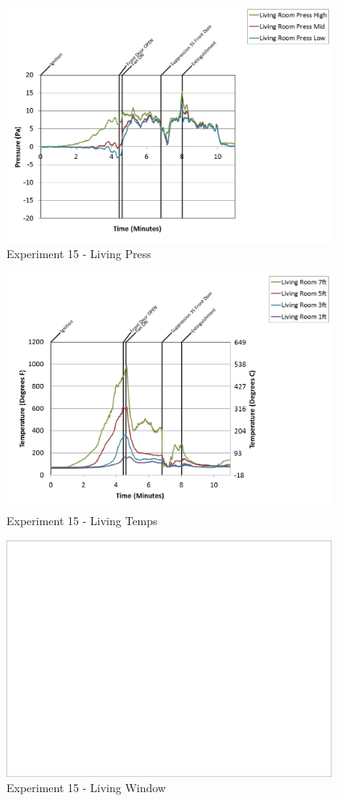 \documentclass{article}
\begin{document}
\begin{appendices}
\begin{figure}[h!]
	\centering
	\includegraphics[height=3.05in]{0_Images/Results_Charts/Exp_15_Charts/LivingPress.png}
	\caption{Experiment 15 - Living Press}
\end{figure}

\clearpage

\begin{figure}[h!]
	\centering
	\includegraphics[height=3.05in]{0_Images/Results_Charts/Exp_15_Charts/LivingTemps.png}
	\caption{Experiment 15 - Living Temps}
\end{figure}


\begin{figure}[h!]
	\centering
	\includegraphics[height=3.05in]{0_Images/Results_Charts/Exp_15_Charts/LivingWindow.png}
	\caption{Experiment 15 - Living Window}
\end{figure}


\end{appendices}
\end{document}
